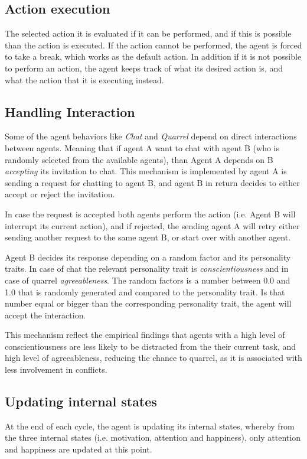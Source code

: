 \subsection{Action execution}
The selected action it is evaluated if it can be performed, and if this is possible
than the action is executed. If the action cannot be performed, the agent is forced
to take a break, which works as the default action. In addition if it is not possible
to perform an action, the agent keeps track of what its desired action is, and what
the action that it is executing instead. 

\subsection{Handling Interaction}
Some of the agent behaviors like \textit{Chat} and \textit{Quarrel} depend on direct
interactions between agents. Meaning that if agent A want to chat with agent B (who is
randomly selected from the available agents), than Agent A depends on B
\textit{accepting} its invitation to chat. This mechanism is implemented
by agent A is sending a request for chatting to agent B, and agent B in return
decides to either accept or reject the invitation. 

In case the request is accepted both agents perform the action (i.e. Agent B will
interrupt its current action), and if rejected, the sending agent A will retry either
sending another request to the same agent B, or start over with another agent.

\bb

Agent B decides its response depending on a random factor and its personality traits.
In case of chat the relevant personality trait is \textit{conscientiousness} and
in case of quarrel \textit{agreeableness}. The random factors is a number between 0.0
and 1.0 that is randomly generated and compared to the personality trait.
Is that number equal or bigger than the corresponding personality trait, the agent
will accept the interaction.

\bb

This mechanism reflect the empirical findings that agents with a high level of
conscientiousness are less likely to be distracted from the their current task,
and high level of agreeableness, reducing the chance to quarrel, as it is associated
with less involvement in conflicts.

\subsection{Updating internal states}
At the end of each cycle, the agent is updating its internal states, whereby
from the three internal states (i.e. motivation, attention and happiness), only attention
and happiness are updated at this point.

